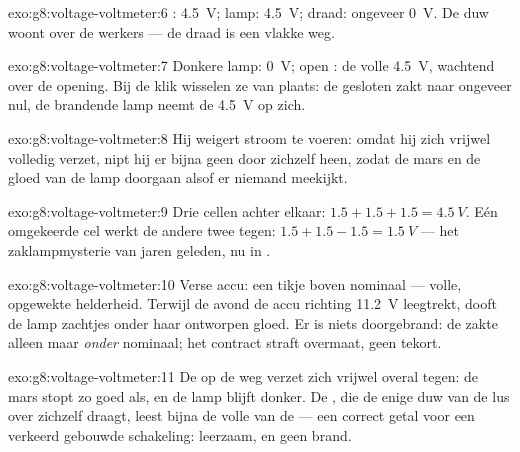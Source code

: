 \begin{solution}{exo:g8:voltage-voltmeter:6}
: \qty{4.5}{V}; lamp: \qty{4.5}{V}; draad: ongeveer
\qty{0}{V}. De duw woont over de werkers --- de draad is een vlakke weg.
\end{solution}

\begin{solution}{exo:g8:voltage-voltmeter:7}
Donkere lamp: \qty{0}{V}; open : de volle
\qty{4.5}{V}, wachtend over de opening. Bij de klik wisselen ze van
plaats: de gesloten  zakt naar ongeveer nul, de
brandende lamp neemt de \qty{4.5}{V} op zich.
\end{solution}

\begin{solution}{exo:g8:voltage-voltmeter:8}
Hij weigert stroom te voeren: omdat hij zich vrijwel volledig verzet,
nipt hij er bijna geen door zichzelf heen, zodat de mars en de gloed van
de lamp doorgaan alsof er niemand meekijkt.
\end{solution}

\begin{solution}{exo:g8:voltage-voltmeter:9}
Drie cellen achter elkaar: $1.5 + 1.5 + 1.5 = \qty{4.5}{V}$. Eén
omgekeerde cel werkt de andere twee tegen: $1.5 + 1.5 - 1.5 =
\qty{1.5}{V}$ --- het zaklampmysterie van jaren geleden, nu in
.
\end{solution}

\begin{solution}{exo:g8:voltage-voltmeter:10}
Verse accu: een tikje boven nominaal --- volle, opgewekte
helderheid. Terwijl de avond de accu richting \qty{11.2}{V}
leegtrekt, dooft de lamp zachtjes onder haar ontworpen gloed. Er is
niets doorgebrand: de  zakte alleen maar \emph{onder}
nominaal; het contract straft overmaat, geen tekort.
\end{solution}

\begin{solution}{exo:g8:voltage-voltmeter:11}
De  op de weg verzet zich vrijwel overal tegen: de mars
stopt zo goed als, en de lamp blijft donker. De , die de enige duw
van de lus over zichzelf draagt, leest bijna de volle
 van de  --- een correct getal voor
een verkeerd gebouwde schakeling: leerzaam, en geen brand.
\end{solution}

